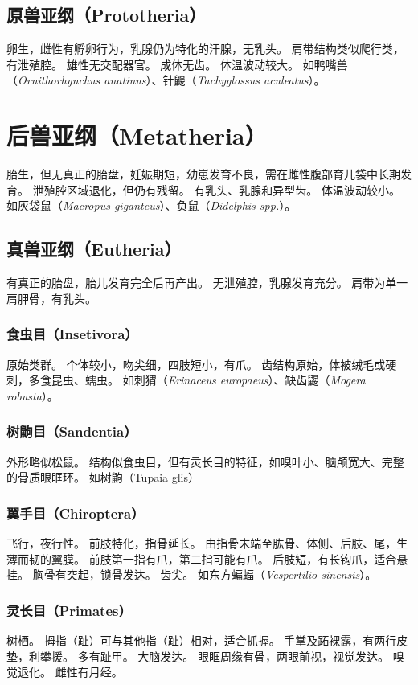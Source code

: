 \documentclass[11pt]{article}
\begin{document}
\subsection{原兽亚纲（Prototheria）}
卵生，雌性有孵卵行为，乳腺仍为特化的汗腺，无乳头。
肩带结构类似爬行类，有泄殖腔。
雄性无交配器官。
成体无齿。
体温波动较大。
如鸭嘴兽（\textit{Ornithorhynchus anatinus}）、针鼹（\textit{Tachyglossus aculeatus}）。

\section{后兽亚纲（Metatheria）}
胎生，但无真正的胎盘，妊娠期短，幼崽发育不良，需在雌性腹部育儿袋中长期发育。
泄殖腔区域退化，但仍有残留。
有乳头、乳腺和异型齿。
体温波动较小。
如灰袋鼠（\textit{Macropus giganteus}）、负鼠（\textit{Didelphis spp.}）。

\subsection{真兽亚纲（Eutheria）}
有真正的胎盘，胎儿发育完全后再产出。
无泄殖腔，乳腺发育充分。
肩带为单一肩胛骨，有乳头。

\subsubsection{食虫目（Insetivora）}
原始类群。
个体较小，吻尖细，四肢短小，有爪。
齿结构原始，体被绒毛或硬刺，多食昆虫、蠕虫。
如刺猬（\textit{Erinaceus europaeus}）、缺齿鼹（\textit{Mogera robusta}）。

\subsubsection{树鼩目（Sandentia）}
外形略似松鼠。
结构似食虫目，但有灵长目的特征，如嗅叶小、脑颅宽大、完整的骨质眼眶环。
如树鼩（Tupaia glis）

\subsubsection{翼手目（Chiroptera）}
飞行，夜行性。
前肢特化，指骨延长。
由指骨末端至肱骨、体侧、后肢、尾，生薄而韧的翼膜。
前肢第一指有爪，第二指可能有爪。
后肢短，有长钩爪，适合悬挂。
胸骨有突起，锁骨发达。
齿尖。
如东方蝙蝠（\textit{Vespertilio sinensis}）。

\subsubsection{灵长目（Primates）}
树栖。
拇指（趾）可与其他指（趾）相对，适合抓握。
手掌及跖裸露，有两行皮垫，利攀援。
多有趾甲。
大脑发达。
眼眶周缘有骨，两眼前视，视觉发达。
嗅觉退化。
雌性有月经。
\end{document}
